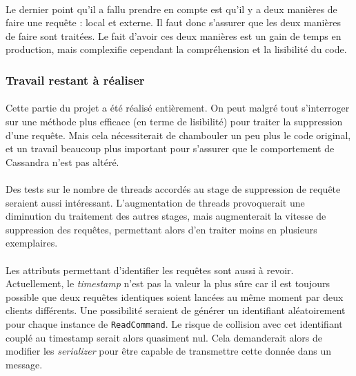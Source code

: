 \documentclass[12pt]{article}
\newcommand{\class}[1]{\texttt{#1}}
\begin{document}
\paragraph{}Le dernier point qu'il a fallu prendre en compte est qu'il y a deux manières de faire une requête : local et externe. Il faut donc s'assurer que les deux manières de faire sont traitées. Le fait d'avoir ces deux manières est un gain de temps en production, mais complexifie cependant la compréhension et la lisibilité du code.

\subsubsection*{Travail restant à réaliser}

\paragraph{}Cette partie du projet a été réalisé entièrement. On peut malgré tout s'interroger sur une méthode plus efficace (en terme de lisibilité) pour traiter la suppression d'une requête. Mais cela nécessiterait de chambouler un peu plus le code original, et un travail beaucoup plus important pour s'assurer que le comportement de Cassandra n'est pas altéré.

\paragraph{}Des tests sur le nombre de threads accordés au stage de suppression de requête seraient aussi intéressant. L'augmentation de threads provoquerait une diminution du traitement des autres stages, mais augmenterait la vitesse de suppression des requêtes, permettant alors d'en traiter moins en plusieurs exemplaires.

\paragraph{}Les attributs permettant d'identifier les requêtes sont aussi à revoir. Actuellement, le \textit{timestamp} n'est pas la valeur la plus sûre car il est toujours possible que deux requêtes identiques soient lancées au même moment par deux clients différents. Une possibilité seraient de générer un identifiant aléatoirement pour chaque instance de \class{ReadCommand}. Le risque de collision avec cet identifiant couplé au timestamp serait alors quasiment nul. Cela demanderait alors de modifier les \textit{serializer} pour être capable de transmettre cette donnée dans un message.
\end{document}
